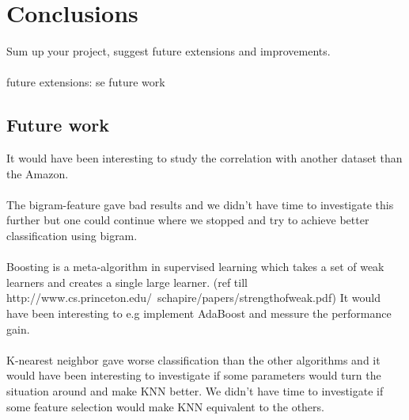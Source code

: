 \chapter{Conclusions}
Sum up your project, suggest future extensions and improvements.
\\\\
future extensions: se future work

\section{Future work}
It would have been interesting to study the correlation with another dataset than the Amazon.  \\\\
The bigram-feature gave bad results and we didn't have time to investigate this further but one could continue where we stopped and try to achieve better classification using bigram. \\\\
Boosting is a meta-algorithm in supervised learning which takes a set of weak learners and creates a single large learner. (ref till http://www.cs.princeton.edu/~schapire/papers/strengthofweak.pdf) It would have been interesting to e.g implement AdaBoost and messure the performance gain. \\\\
K-nearest neighbor gave worse classification than the other algorithms and it would have been interesting to investigate if some parameters would turn the situation around and make KNN better. We didn't have time to investigate if some feature selection would make KNN equivalent to the others.
